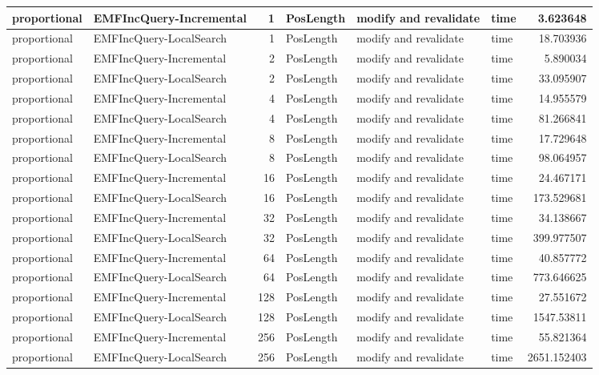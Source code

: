 \begin{table}
\begin{tabular}{| l | l | r | l | l | l | r |}
proportional & EMFIncQuery-Incremental & 1 & PosLength & modify and revalidate & time & 3.623648\\\hline
proportional & EMFIncQuery-LocalSearch & 1 & PosLength & modify and revalidate & time & 18.703936\\\hline
proportional & EMFIncQuery-Incremental & 2 & PosLength & modify and revalidate & time & 5.890034\\\hline
proportional & EMFIncQuery-LocalSearch & 2 & PosLength & modify and revalidate & time & 33.095907\\\hline
proportional & EMFIncQuery-Incremental & 4 & PosLength & modify and revalidate & time & 14.955579\\\hline
proportional & EMFIncQuery-LocalSearch & 4 & PosLength & modify and revalidate & time & 81.266841\\\hline
proportional & EMFIncQuery-Incremental & 8 & PosLength & modify and revalidate & time & 17.729648\\\hline
proportional & EMFIncQuery-LocalSearch & 8 & PosLength & modify and revalidate & time & 98.064957\\\hline
proportional & EMFIncQuery-Incremental & 16 & PosLength & modify and revalidate & time & 24.467171\\\hline
proportional & EMFIncQuery-LocalSearch & 16 & PosLength & modify and revalidate & time & 173.529681\\\hline
proportional & EMFIncQuery-Incremental & 32 & PosLength & modify and revalidate & time & 34.138667\\\hline
proportional & EMFIncQuery-LocalSearch & 32 & PosLength & modify and revalidate & time & 399.977507\\\hline
proportional & EMFIncQuery-Incremental & 64 & PosLength & modify and revalidate & time & 40.857772\\\hline
proportional & EMFIncQuery-LocalSearch & 64 & PosLength & modify and revalidate & time & 773.646625\\\hline
proportional & EMFIncQuery-Incremental & 128 & PosLength & modify and revalidate & time & 27.551672\\\hline
proportional & EMFIncQuery-LocalSearch & 128 & PosLength & modify and revalidate & time & 1547.53811\\\hline
proportional & EMFIncQuery-Incremental & 256 & PosLength & modify and revalidate & time & 55.821364\\\hline
proportional & EMFIncQuery-LocalSearch & 256 & PosLength & modify and revalidate & time & 2651.152403\\\hline

\end{tabular}
\end{table}
